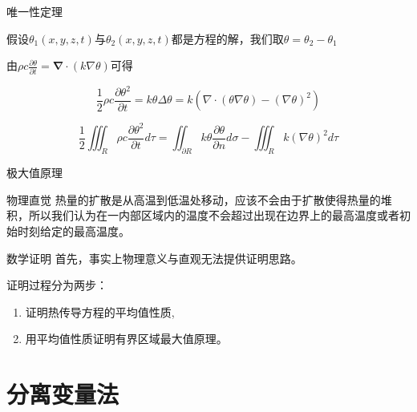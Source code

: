 \documentclass[10pt]{beamer}
\begin{document}
\begin{frame}[allowframebreaks]{唯一性定理}

假设$\theta _{1}\left ( x,y,z,t\right )$与$\theta _{2}\left ( x,y,z,t\right )$都是方程的解，我们取$\theta =\theta _{2}-\theta _{1}$

由$\rho c \frac{\partial \theta}{\partial t}=\mathbf{\nabla} \cdot(k \nabla \theta)$可得

\begin{equation}
\frac{1}{2}\rho c\frac{\partial \theta ^{2}}{\partial t}=k\theta \Delta \theta  =k\left ( \nabla \cdot \left (\theta  \nabla \theta  \right )-\left ( \nabla\theta \right )^{2}\right )
\end{equation}

\begin{equation}\frac{1}{2}\iiint _{R}\rho c\frac{\partial \theta ^{2}}{\partial t}d\tau =\iint_{\partial R}k\theta \frac{\partial \theta }{\partial n}d\sigma -\iiint _{R}k\left ( \nabla\theta \right )^{2}d\tau 
\end{equation}

\end{frame}

\begin{frame}[allowframebreaks]{极大值原理}


\begin{alertblock}{物理直觉}
  \vspace{3pt}
  热量的扩散是从高温到低温处移动，应该不会由于扩散使得热量的堆积，所以我们认为在一内部区域内的温度不会超过出现在边界上的最高温度或者初始时刻给定的最高温度。
\end{alertblock}

\begin{alertblock}{数学证明}
  \vspace{3pt}
  首先，事实上物理意义与直观无法提供证明思路。
  
  证明过程分为两步：
  \begin{enumerate}
    \item 证明热传导方程的平均值性质,
    \item 用平均值性质证明有界区域最大值原理。
  \end{enumerate}
\end{alertblock}

\end{frame}

\section{分离变量法}
\end{document}

